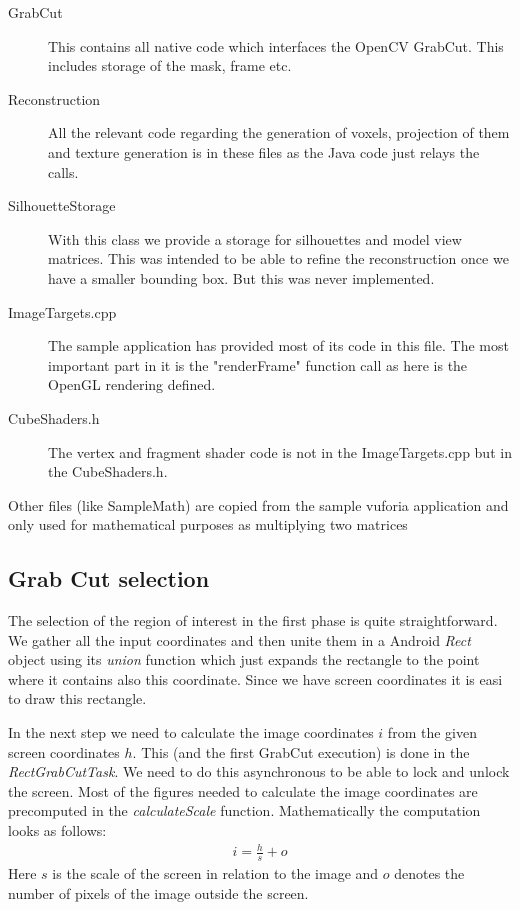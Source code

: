 \documentclass[10pt,twocolumn,letterpaper]{article}
\begin{document}
\begin{description}
	\item[GrabCut] This contains all native code which interfaces the OpenCV GrabCut. This includes storage of the mask, frame etc.
	\item[Reconstruction] All the relevant code regarding the generation of voxels, projection of them and texture generation is in these files as the Java code just relays the calls.
	\item[SilhouetteStorage] With this class we provide a storage for silhouettes and model view matrices. This was intended to be able to refine the reconstruction once we have a smaller bounding box. But this was never implemented.
	\item[ImageTargets.cpp] The sample application has provided most of its code in this file. The most important part in it is the "renderFrame" function call as here is the OpenGL rendering defined.
	\item[CubeShaders.h] The vertex and fragment shader code is not in the ImageTargets.cpp but in the CubeShaders.h.
\end{description}

Other files (like SampleMath) are copied from the sample vuforia application and only used for mathematical purposes as multiplying two matrices


\subsection{Grab Cut selection}

The selection of the region of interest in the first phase is quite straightforward. We gather all the input coordinates and then unite them in a Android \emph{Rect} object using its \emph{union} function which just expands the rectangle to the point where it contains also this coordinate. Since we have screen coordinates it is easi to draw this rectangle.

In the next step we need to calculate the image coordinates $i$ from the given screen coordinates $h$. This (and the first GrabCut execution) is done in the \emph{RectGrabCutTask}. We need to do this asynchronous to be able to lock and unlock the screen. Most of the figures needed to calculate the image coordinates are precomputed in the \emph{calculateScale} function. Mathematically the computation looks as follows:
\begin{align} \label{imgCoord}
	i = \frac{h}{s} + o
\end{align}
Here $s$ is the scale of the screen in relation to the image and $o$ denotes the number of pixels of the image outside the screen.
\end{document}
